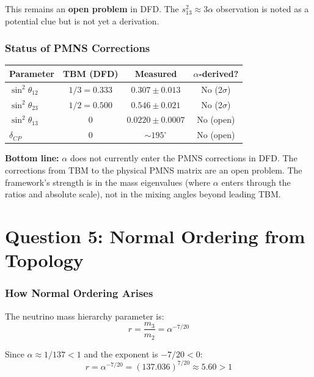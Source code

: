 \documentclass[11pt,a4paper]{article}
\begin{document}
This remains an \textbf{open problem} in DFD. The $s_{13}^2 \approx 3\alpha$
observation is noted as a potential clue but is not yet a derivation.

\section{Status of PMNS Corrections}

\begin{center}
\begin{tabular}{lccc}
\toprule
Parameter & TBM (DFD) & Measured & $\alpha$-derived? \\
\midrule
$\sin^2\theta_{12}$ & $1/3 = 0.333$ & $0.307 \pm 0.013$ & No (2$\sigma$) \\
$\sin^2\theta_{23}$ & $1/2 = 0.500$ & $0.546 \pm 0.021$ & No (2$\sigma$) \\
$\sin^2\theta_{13}$ & $0$ & $0.0220 \pm 0.0007$ & No (open) \\
$\delta_{CP}$ & $0$ & $\sim 195^\circ$ & No (open) \\
\bottomrule
\end{tabular}
\end{center}

\textbf{Bottom line:} $\alpha$ does not currently enter the PMNS
corrections in DFD. The corrections from TBM to the physical PMNS matrix
are an open problem. The framework's strength is in the mass eigenvalues
(where $\alpha$ enters through the ratios and absolute scale), not in the
mixing angles beyond leading TBM.


\part{Question 5: Normal Ordering from Topology}

\section{How Normal Ordering Arises}

The neutrino mass hierarchy parameter is:
\begin{equation}
r = \frac{m_3}{m_2} = \alpha^{-7/20}
\end{equation}

Since $\alpha \approx 1/137 < 1$ and the exponent is $-7/20 < 0$:
\begin{equation}
r = \alpha^{-7/20} = (137.036)^{7/20} \approx 5.60 > 1
\end{equation}
\end{document}
